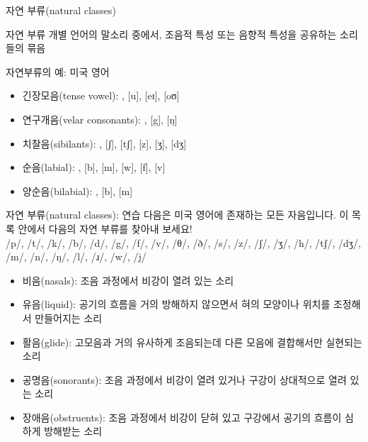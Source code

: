 \documentclass[11pt, aspectratio=169]{beamer}
\newcommand{\textds}[1]{{\ipafont #1}}
\begin{document}
\begin{frame}[t]{자연 부류(natural classes)}
    \begin{block}{자연 부류}
        개별 언어의 말소리 중에서, 조음적 특성 또는 음향적 특성을 공유하는 소리들의 묶음
    \end{block}
    \begin{block}{자연부류의 예: 미국 영어}
        \begin{itemize}
            \item 긴장모음(tense vowel): \textds{[i], [u], [eɪ], [oʊ]}
            \item 연구개음(velar consonants): \textds{[k], [g], [ŋ]}
            \item 치찰음(sibilants): \textds{[s], [ʃ], [tʃ], [z], [ʒ], [dʒ]}
            \item 순음(labial): \textds{[p], [b], [m], [w], [f], [v]}
            \item 양순음(bilabial): \textds{[p], [b], [m]}
        \end{itemize}
    \end{block}
\end{frame}

\begin{frame}[t]{자연 부류(natural classes): 연습}
    다음은 미국 영어에 존재하는 모든 자음입니다. 이 목록 안에서 다음의 자연 부류를 찾아내 보세요! \\
    {\textds{/p/, /t/, /k/, /b/, /d/, /g/, /f/, /v/, /θ/, /ð/, /s/, /z/, /ʃ/, /ʒ/, /h/, /tʃ/, /dʒ/, /m/, /n/, /ŋ/, /l/, /ɹ/, /w/, /j/}}
    \vspace{0.3cm}
    \begin{itemize}
        \item 비음(nasals): {\small 조음 과정에서 비강이 열려 있는 소리} %
        \item 유음(liquid): {\small 공기의 흐름을 거의 방해하지 않으면서 혀의 모양이나 위치를 조정해서 만들어지는 소리} %
        \item 활음(glide): {\small 고모음과 거의 유사하게 조음되는데 다른 모음에 결합해서만 실현되는 소리} %
        \item 공명음(sonorants): {\small 조음 과정에서 비강이 열려 있거나 구강이 상대적으로 열려 있는 소리} %
        \item 장애음(obstruents): {\small 조음 과정에서 비강이 닫혀 있고 구강에서 공기의 흐름이 심하게 방해받는 소리} %
    \end{itemize}
\end{frame}
\end{document}

